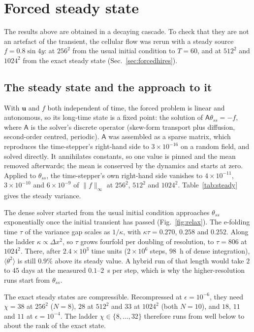 \documentclass[aps,prfluids,reprint,onecolumn,amsmath,amssymb,nofootinbib,floatfix]{revtex4-2}
\begin{document}
\section{Forced steady state}
\label{sec:forced}

The results above are obtained in a decaying cascade. To check that they are not
an artefact of the transient, the cellular flow was rerun with a steady source
$f=0.8\sin 4y$: at $256^2$ from the usual initial condition to $T=60$, and at
$512^2$ and $1024^2$ from the exact steady state
(Sec.~\ref{sec:forcedhires}).

\subsection{The steady state and the approach to it}

With $\mathbf{u}$ and $f$ both independent of time, the forced problem is linear
and autonomous, so its long-time state is a fixed point: the solution of
$\mathsf{A}\theta_{ss}=-f$, where $\mathsf{A}$ is the solver's discrete operator
(skew-form transport plus diffusion, second-order centred, periodic).
$\mathsf{A}$ was assembled as a sparse matrix, which reproduces the
time-stepper's right-hand side to $3\times10^{-16}$ on a random field, and
solved directly. It annihilates constants, so one value is pinned and the mean
removed afterwards; the mean is conserved by the dynamics and starts at zero.
Applied to $\theta_{ss}$, the time-stepper's own right-hand side vanishes to
$4\times10^{-11}$, $3\times10^{-10}$ and $6\times10^{-9}$ of $\|f\|_\infty$ at
$256^2$, $512^2$ and $1024^2$. Table~\ref{tab:steady} gives the steady variance.

The dense solver started from the usual initial condition approaches
$\theta_{ss}$ exponentially once the initial transient has passed
(Fig.~\ref{fig:relax}). The e-folding time $\tau$ of the variance gap scales as
$1/\kappa$, with $\kappa\tau=0.270$, $0.258$ and $0.252$. Along the ladder
$\kappa\propto\Delta x^2$, so $\tau$ grows fourfold per doubling of resolution,
to $\tau=806$ at $1024^2$. There, after $2.4\times10^3$ time units
($2\times10^6$ steps, $98$~h of dense integration), $\langle\theta^2\rangle$ is
still $0.9\%$ above its steady value. A hybrid run of that length would take
$2$ to $45$ days at the measured $0.1$--$2$~s per step, which is why the
higher-resolution runs start from $\theta_{ss}$.

The exact steady states are compressible. Recompressed at
$\epsilon=10^{-6}$, they need $\chi=38$ at $256^2$ ($N=8$), $28$ at $512^2$ and
$33$ at $1024^2$ (both $N=10$), and $18$, $11$ and $11$ at $\epsilon=10^{-4}$.
The ladder $\chi\in\{8,\dots,32\}$ therefore runs from well below to about the
rank of the exact state.
\end{document}
